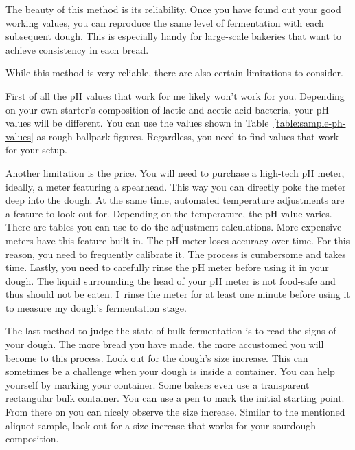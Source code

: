 The beauty of this method is its reliability. Once you have found
out your good working values, you can reproduce
the same level of fermentation with each subsequent dough.
This is especially handy for large-scale bakeries that want
to achieve consistency in each bread.

While this method is very reliable, there are also certain
limitations to consider.

First of all the pH values that work for me likely won't work for
you. Depending on your own starter's composition of lactic
and acetic acid bacteria, your pH values will be different.
You can use the values shown in Table~\ref{table:sample-ph-values}
as rough ballpark figures. Regardless, you need to find values
that work for your setup.

Another limitation is the price. You will need to purchase
a high-tech pH meter, ideally, a meter featuring a spearhead.
This way you can directly poke the meter deep into the dough.
At the same time, automated temperature adjustments are a
feature to look out for. Depending on the temperature,
the pH value varies. There are tables you can use to
do the adjustment calculations. More expensive meters
have this feature built in. The pH meter loses accuracy
over time. For this reason, you need to frequently
calibrate it. The process is cumbersome and takes time.
Lastly, you need to carefully rinse the pH meter before
using it in your dough. The liquid surrounding the
head of your pH meter is not food-safe and thus should
not be eaten. I~rinse the meter for at least one minute
before using it to measure my dough's fermentation stage.

The last method to judge the state of bulk fermentation
is to read the signs of your dough. The more bread you have
made, the more accustomed you will become to this process.
Look out for the dough's size increase. This can sometimes
be a challenge when your dough is inside a container.
You can help yourself by marking your container. Some bakers
even use a transparent rectangular bulk container. You
can use a pen to mark the initial starting point. From there
on you can nicely observe the size increase. Similar to the
mentioned aliquot sample, look out for a size increase that works
for your sourdough composition.

